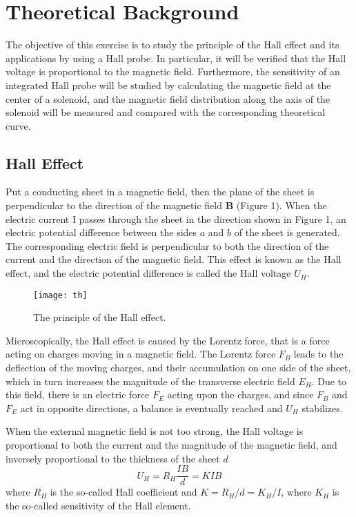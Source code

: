 \documentclass[a4paper,12pt]{article}
\begin{document}
\section{Theoretical Background}
The objective of this exercise is to study the principle of the Hall effect and its applications by using a Hall probe. In particular, it will be verified that the Hall voltage is proportional to the magnetic field. Furthermore, the sensitivity of an integrated Hall probe will be studied by calculating the magnetic field at the center of a solenoid, and the magnetic field distribution along the axis of the solenoid will be measured and compared with the corresponding theoretical curve.
\subsection{Hall Effect}
Put a conducting sheet in a magnetic field, then the plane of the sheet is perpendicular to the direction of the magnetic field \textbf{B} (Figure 1). When the electric current I passes through the sheet in the direction shown
in Figure 1, an electric potential difference between the sides $ a $ and $ b $ of the sheet is generated. The corresponding electric field is perpendicular to both the direction of the current and the direction of the magnetic field. This effect is known as the Hall effect, and the electric potential difference is called the Hall voltage $ U_H $.
\begin{figure}[H]
	\centering
	\texttt{[image: th]}
	\caption{The principle of the Hall effect.}
\end{figure}
Microscopically, the Hall effect is caused by the Lorentz force, that is a force acting on charges moving in a magnetic field. The Lorentz force $ F_B $ leads to the deflection of the moving charges, and their accumulation on one side of the sheet, which in turn increases the magnitude of the transverse electric field $ E_H $. Due to this field, there is an electric force $ F_E $ acting upon the charges, and since $ F_B $ and $ F_E $ act in opposite directions, a balance is eventually reached and $ U_H $ stabilizes.

When the external magnetic field is not too strong, the Hall voltage is proportional to both the current and the magnitude of the magnetic field, and inversely proportional to the thickness of the sheet $ d $
\begin{equation}
	 U_H=R_H\dfrac{IB}{d}=KIB
\end{equation}
where $ R_H $ is the so-called Hall coefficient and $ K=R_H/d=K_H/I $, where $ K_H $ is the so-called sensitivity of the Hall element.
\end{document}
